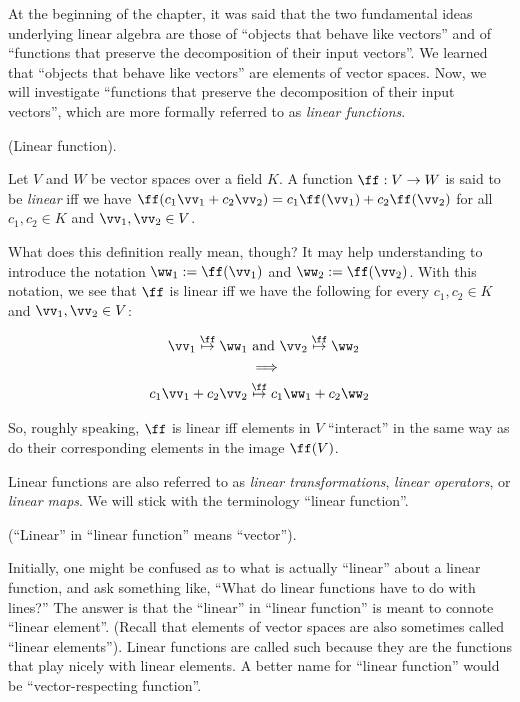 At the beginning of the chapter, it was said that the two fundamental ideas underlying linear algebra are those of ``objects that behave like vectors'' and of ``functions that preserve the decomposition of their input vectors''. We learned that ``objects that behave like vectors'' are elements of vector spaces. Now, we will investigate ``functions that preserve the decomposition of their input vectors'', which are more formally referred to as \textit{linear functions}.

\begin{defn}
\label{ch::lin_alg::defn::linear_function_intuitive}
    (Linear function). 
    
    Let $V$ and $W$ be vector spaces over a field $K$. A function $\ff:V \rightarrow W$ is said to be \textit{linear} iff we have $\ff(c_1 \vv_1 + c_2 \vv_2) = c_1 \ff(\vv_1) + c_2 \ff(\vv_2)$ for all $c_1, c_2 \in K$ and $\vv_1, \vv_2 \in V$.
    
    What does this definition really mean, though? It may help understanding to introduce the notation $\ww_1 := \ff(\vv_1)$ and $\ww_2 := \ff(\vv_2)$. With this notation, we see that $\ff$ is linear iff we have the following for every $c_1, c_2 \in K$ and $\vv_1, \vv_2 \in V$:
    
    \begin{align*}
        \vv_1 \overset{\ff}{\mapsto} \ww_1 &\text{ and } \vv_2 \overset{\ff}{\mapsto} \ww_2 \\
        &\implies \\
        c_1 \vv_1 + c_2 \vv_2 &\overset{\ff}{\mapsto} c_1 \ww_1 + c_2 \ww_2
    \end{align*}
    
    So, roughly speaking, $\ff$ is linear iff elements in $V$ ``interact'' in the same way as do their corresponding elements in the image $\ff(V)$.
    
    Linear functions are also referred to as \textit{linear transformations}, \textit{linear operators}, or \textit{linear maps}. We will stick with the terminology ``linear function''.
\end{defn}

\begin{remark}
    (``Linear'' in ``linear function'' means ``vector'').
    
    Initially, one might be confused as to what is actually ``linear'' about a linear function, and ask something like, ``What do linear functions have to do with lines?'' The answer is that the ``linear'' in ``linear function'' is meant to connote ``linear element''. (Recall that elements of vector spaces are also sometimes called ``linear elements''). Linear functions are called such because they are the functions that play nicely with linear elements. A better name for ``linear function'' would be ``vector-respecting function''.
\end{remark}

